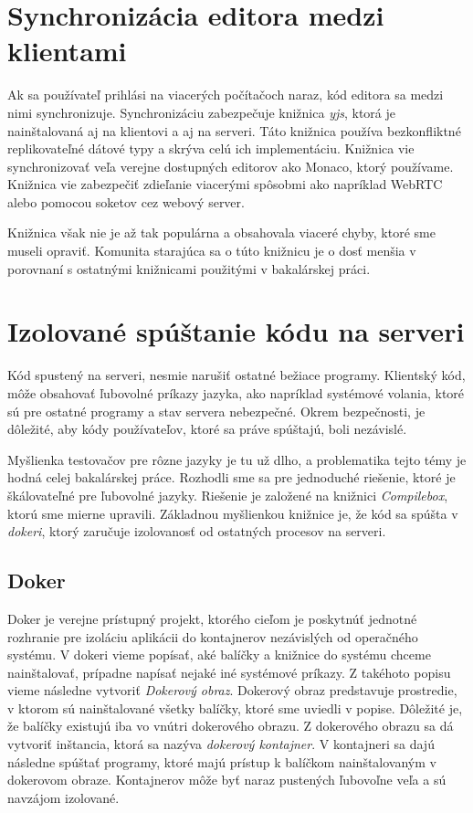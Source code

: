 \section{Synchronizácia editora medzi klientami}
Ak sa používateľ prihlási na viacerých počítačoch naraz, kód editora sa medzi nimi synchronizuje.
Synchronizáciu zabezpečuje knižnica \textit{yjs}, ktorá je nainštalovaná aj na klientovi a aj na
serveri. Táto knižnica používa bezkonfliktné replikovateľné dátové typy a skrýva celú ich
implementáciu. Knižnica vie synchronizovať veľa verejne dostupných editorov ako Monaco,
ktorý používame. Knižnica vie zabezpečiť zdieľanie viacerými spôsobmi ako napríklad WebRTC alebo
pomocou soketov cez webový server. 

Knižnica však nie je až tak populárna a obsahovala viaceré chyby, ktoré sme museli opraviť. Komunita
starajúca sa o túto knižnicu je o dosť menšia v porovnaní s ostatnými knižnicami použitými v
bakalárskej práci.

\section{Izolované spúštanie kódu na serveri}
Kód spustený na serveri, nesmie narušiť ostatné bežiace programy. Klientský kód, môže obsahovať
ľubovolné príkazy jazyka, ako napríklad systémové volania, ktoré sú pre ostatné programy a stav
servera nebezpečné. Okrem bezpečnosti, je dôležité, aby kódy používateľov, ktoré sa práve spúštajú,
boli nezávislé.

Myšlienka testovačov pre rôzne jazyky je tu už dlho, a problematika tejto témy je hodná celej
bakalárskej práce. Rozhodli sme sa pre jednoduché riešenie, ktoré je škálovateľné pre ľubovolné
jazyky. Riešenie je založené na knižnici \textit{Compilebox}, ktorú sme mierne upravili. Základnou
myšlienkou knižnice je, že kód sa spúšta v \textit{dokeri}, ktorý zaručuje izolovanosť od ostatných
procesov na serveri. 

\subsection{Doker}
Doker je verejne prístupný projekt, ktorého cieľom je poskytnúť jednotné rozhranie pre izoláciu
aplikácii do kontajnerov nezávislých od operačného systému. V dokeri vieme popísať, aké balíčky a
knižnice do systému chceme nainštalovať, prípadne napísať nejaké iné systémové príkazy. Z takéhoto
popisu vieme následne vytvoriť \textit{Dokerový obraz}. Dokerový obraz predstavuje prostredie, v
ktorom sú nainštalované všetky balíčky, ktoré sme uviedli v popise. Dôležité je, že balíčky existujú
iba vo vnútri dokerového obrazu. Z dokerového obrazu sa dá vytvoriť inštancia, ktorá sa nazýva
\textit{dokerový kontajner}. V kontajneri sa dajú následne spúštať programy, ktoré majú prístup k
balíčkom nainštalovaným v dokerovom obraze. Kontajnerov môže byť naraz pustených ľubovoľne veľa a sú
navzájom izolované. 

